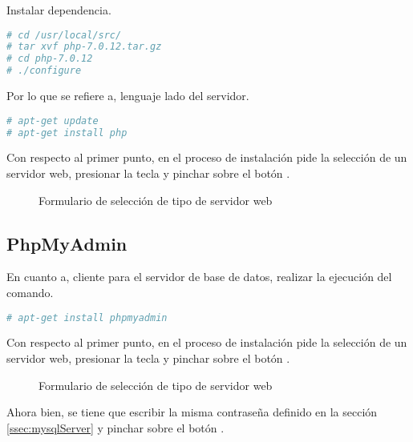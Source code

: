 Instalar dependencia.


\begin{lstlisting}[language=bash, caption={Comando para instalación de lenguaje en el lado del servidor}]
# cd /usr/local/src/
# tar xvf php-7.0.12.tar.gz
# cd php-7.0.12
# ./configure 
\end{lstlisting}

Por lo que se refiere a, lenguaje lado del servidor.

\begin{lstlisting}[language=bash, caption={Comando para instalación de lenguaje en el lado del servidor}]
# apt-get update
# apt-get install php
\end{lstlisting}

Con respecto al primer punto, en el proceso de instalación pide la selección
de un servidor web, presionar la tecla  y pinchar sobre
el botón .

\begin{figure}[!ht]
\centering
		\caption{Formulario de selección de tipo de servidor web}
\end{figure}

\subsection{PhpMyAdmin}

En cuanto a, cliente para el servidor de base de datos, realizar la ejecución
del comando.

\begin{lstlisting}[language=bash, caption={Comando para instalación de cliente para base de datos}]
# apt-get install phpmyadmin 
\end{lstlisting}

Con respecto al primer punto, en el proceso de instalación pide la selección
de un servidor web, presionar la tecla  y pinchar sobre
el botón .

\begin{figure}[!ht]
\centering
		\caption{Formulario de selección de tipo de servidor web}
\end{figure}

Ahora bien, se tiene que escribir la misma contraseña definido en la sección
\ref{ssec:mysqlServer} y pinchar sobre el botón .

